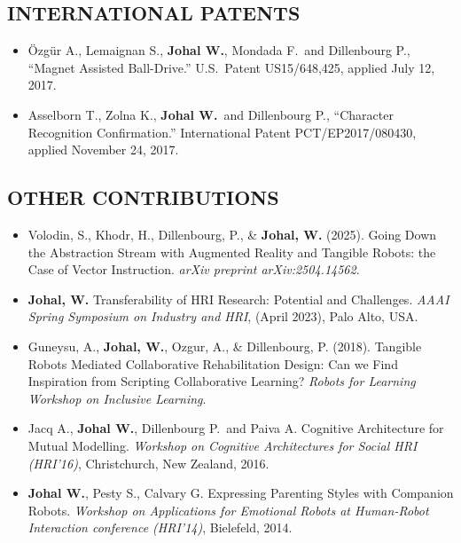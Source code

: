 \vspace{0.1in}

\subsection{INTERNATIONAL PATENTS}
\vspace{2pt}

\begin{itemize}[nosep]
    \renewcommand\labelitemi{$\bullet$}
    \item Özgür A., Lemaignan S., \textbf{Johal W.}, Mondada F.\ and Dillenbourg P., ``Magnet Assisted Ball-Drive.'' U.S.\ Patent US15/648,425, applied July 12, 2017.
    \item Asselborn T., Zolna K., \textbf{Johal W.}\ and Dillenbourg P., ``Character Recognition Confirmation.'' International Patent PCT/EP2017/080430, applied November 24, 2017.
\end{itemize}

\vspace{0.1in}

\subsection{OTHER CONTRIBUTIONS}
\vspace{2pt}

\begin{itemize}[nosep]
    \renewcommand\labelitemi{$\bullet$}
    \item Volodin, S., Khodr, H., Dillenbourg, P., \& \textbf{Johal, W.} (2025). Going Down the Abstraction Stream with Augmented Reality and Tangible Robots: the Case of Vector Instruction. \textit{arXiv preprint arXiv:2504.14562}.

    \item \textbf{Johal, W.} Transferability of HRI Research: Potential and Challenges. \textit{AAAI Spring Symposium on Industry and HRI}, (April 2023), Palo Alto, USA.

    \item Guneysu, A., \textbf{Johal, W.}, Ozgur, A., \& Dillenbourg, P. (2018). Tangible Robots Mediated Collaborative Rehabilitation Design: Can we Find Inspiration from Scripting Collaborative Learning? \textit{Robots for Learning Workshop on Inclusive Learning}.

    \item Jacq A., \textbf{Johal W.}, Dillenbourg P.\ and Paiva A. Cognitive Architecture for Mutual Modelling. \textit{Workshop on Cognitive Architectures for Social HRI (HRI'16)}, Christchurch, New Zealand, 2016.

    \item \textbf{Johal W.}, Pesty S., Calvary G. Expressing Parenting Styles with Companion Robots. \textit{Workshop on Applications for Emotional Robots at Human-Robot Interaction conference (HRI'14)}, Bielefeld, 2014.
\end{itemize}

